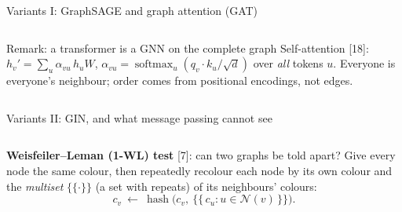 \documentclass[aspectratio=169,10pt]{beamer}
\DeclareMathOperator{\softmax}{softmax}
\renewcommand{\cite}[1]{{\scriptsize\color{cTok}[#1]}}
\newcommand{\key}[1]{\textbf{\color{cAtt}#1}}
\newcommand{\N}{\mathcal N}
\begin{document}
\begin{frame}{Variants I: GraphSAGE and graph attention (GAT)}
\begin{columns}[T,onlytextwidth]
\vspace{0.5mm}
\vspace{-0.5mm}
\begin{block}{Remark: a transformer is a GNN on the complete graph}
\footnotesize
Self-attention \cite{18}: $h_v'=\sum_u\alpha_{vu}\,h_uW$, $\alpha_{vu}=\softmax_u(q_v\!\cdot\!k_u/\sqrt d)$ over \emph{all}
tokens $u$. Everyone is everyone's neighbour; order comes from positional encodings, not edges.
\end{block}
\end{columns}
\end{frame}

\begin{frame}{Variants II: GIN, and what message passing cannot see}
\begin{columns}[T,onlytextwidth]
\centering
{}

\vspace{0.5mm}
\raggedright\footnotesize
\key{Weisfeiler--Leman (1-WL) test} \cite{7}: can two graphs be told apart? Give every node the same
colour, then repeatedly recolour each node by its own colour and the \emph{multiset} $\{\!\{\cdot\}\!\}$
(a set with repeats) of its neighbours' colours:
\vspace{-1.5mm}
\[
 c_v\ \leftarrow\ \operatorname{hash}\bigl(c_v,\ \{\!\{\,c_u:u\in\N(v)\,\}\!\}\bigr).
\]
\vspace{-5mm}


\end{columns}
\end{frame}
\end{document}
